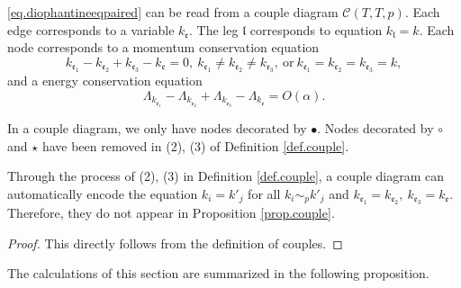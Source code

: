 \begin{prop}\label{prop.couple}
\eqref{eq.diophantineeqpaired} can be read from a couple diagram $\mathcal{C}(T,T,p)$. Each edge corresponds to a variable $k_{\mathfrak{e}}$. The leg $\mathfrak{l}$ corresponds to equation $k_{\mathfrak{l}}=k$. Each node corresponds to a momentum conservation equation
\begin{equation}
    k_{\mathfrak{e}_1}-k_{\mathfrak{e}_2}+k_{\mathfrak{e}_3}-k_{\mathfrak{e}}=0,\ k_{\mathfrak{e}_1}\ne k_{\mathfrak{e}_2}\ne k_{\mathfrak{e}_3},\ \text{or}\ k_{\mathfrak{e}_1}= k_{\mathfrak{e}_2}= k_{\mathfrak{e}_3}=k,
\end{equation} 
and a energy conservation equation 
\begin{equation}
    \Lambda_{k_{\mathfrak{e}_1}}-\Lambda_{k_{\mathfrak{e}_2}}+\Lambda_{k_{\mathfrak{e}_3}}-\Lambda_{k_{\mathfrak{e}}} = O(\alpha).
\end{equation}  
\end{prop}
\begin{rem}
In a couple diagram, we only have nodes decorated by $\bullet$. Nodes decorated by $\circ$ and $\star$ have been removed in (2), (3) of Definition \ref{def.couple}.
\end{rem}
\begin{rem}
Through the process of (2), (3) in Definition \ref{def.couple}, a couple diagram can automatically encode the equation $k_{i}=k'_{j}$ for all $k_{i}\sim_{p}k'_{j}$ and $k_{\mathfrak{e}_1}=k_{\mathfrak{e}_2},\ k_{\mathfrak{e}_3}=k_{\mathfrak{e}}$. Therefore, they do not appear in Proposition \ref{prop.couple}.
\end{rem}

\begin{proof}
This directly follows from the definition of couples. 
\end{proof}

The calculations of this section are summarized in the following proposition. 

